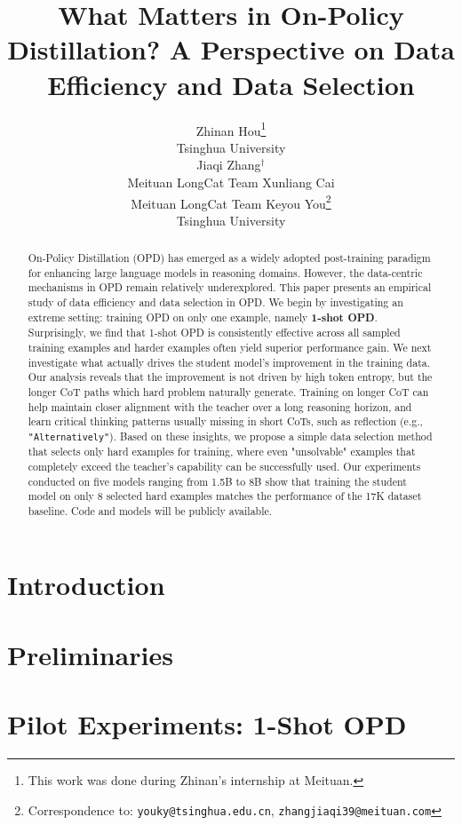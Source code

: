 \documentclass{article} %
\title{What Matters in On-Policy Distillation? A Perspective on Data Efficiency and Data Selection}
\author{Zhinan Hou\thanks{This work was done during Zhinan’s internship at Meituan.} \\
Tsinghua University \\
\And
Jiaqi Zhang$^\dagger$ \\
Meituan LongCat Team
\And
Xunliang Cai \\
Meituan LongCat Team
\And
Keyou You\thanks{Correspondence to: \texttt{youky@tsinghua.edu.cn}, \texttt{zhangjiaqi39@meituan.com}}\\
Tsinghua University 
}
\begin{document}
\maketitle

\begin{abstract}
On-Policy Distillation (OPD) has emerged as a widely adopted post-training paradigm for enhancing large language models in reasoning domains. However, the data-centric mechanisms in OPD remain relatively underexplored. This paper presents an empirical study of data efficiency and data selection in OPD. We begin by investigating an extreme setting: training OPD on only one example, namely \textbf{1-shot OPD}. Surprisingly, we find that 1-shot OPD is consistently effective across all sampled training examples and harder examples often yield superior performance gain. We next investigate what actually drives the student model’s improvement in the training data. Our analysis reveals that the improvement is not driven by high token entropy, but the longer CoT paths which hard problem naturally generate. Training on longer CoT can help maintain closer alignment with the teacher over a long reasoning horizon, and learn critical thinking patterns usually missing in short CoTs, such as reflection (e.g., \texttt{"Alternatively"}). Based on these insights, we propose a simple data selection method that selects only hard examples for training, where even "unsolvable" examples that completely exceed the teacher's capability can be successfully used. Our experiments conducted on five models ranging from 1.5B to 8B show that training the student model on only 8 selected hard examples matches the performance of the 17K dataset baseline. Code and models will be publicly available.
\end{abstract}

\section{Introduction}



\section{Preliminaries}


\section{Pilot Experiments: 1-Shot OPD}

\end{document}
